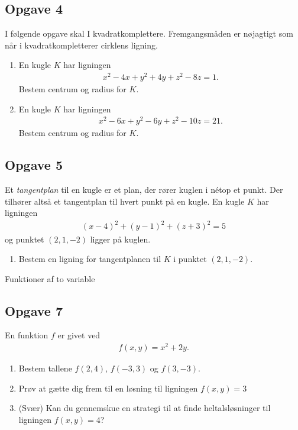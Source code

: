 \subsection*{Opgave 4}
I følgende opgave skal I kvadratkomplettere. Fremgangsmåden er nøjagtigt som når i kvadratkompletterer cirklens ligning.
\begin{enumerate}[label=\roman*)]
	\item En kugle $K$ har ligningen 
	\begin{align*}
		x^2 -4x+y^2+4y+z^2-8z=1.
	\end{align*}
	Bestem centrum og radius for $K$.
	\item En kugle $K$ har ligningen 
	\begin{align*}
		x^2-6x+y^2-6y+z^2-10z=21.
	\end{align*}
	Bestem centrum og radius for $K$.
\end{enumerate}

\subsection*{Opgave 5}
Et \textit{tangentplan} til en kugle er et plan, der rører kuglen i nétop et punkt. Der tilhører altså et tangentplan til hvert punkt på en kugle.
En kugle $K$ har ligningen 
\begin{align*}
	(x-4)^2 + (y-1)^2 + (z+3) ^2 = 5
\end{align*}
og punktet $(2,1,-2)$ ligger på kuglen.
\begin{enumerate}[label=\roman*)]
	\item Bestem en ligning for tangentplanen til $K$ i punktet $(2,1,-2)$.
\end{enumerate}


\begin{center}
	\huge Funktioner af to variable
\end{center}

\subsection*{Opgave 7}
En funktion $f$ er givet ved
	\begin{align*}
		f(x,y) = x^2+2y.
	\end{align*}
\begin{enumerate}[label=\roman*)]
	\item Bestem tallene $f(2,4)$, $f(-3,3)$ og $f(3,-3)$.
	\item Prøv at gætte dig frem til en løsning til ligningen $f(x,y) = 3$
	\item (Svær) Kan du gennemskue en strategi til at finde heltalsløsninger til ligningen $f(x,y) = 4$?
\end{enumerate}
